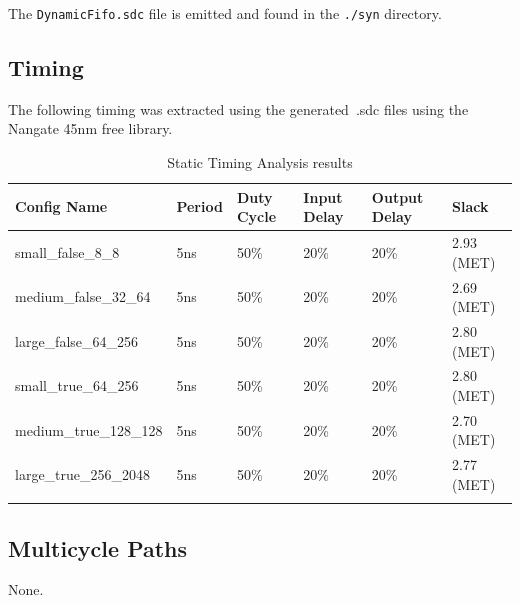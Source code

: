 \documentclass{article}
\begin{document}
The \texttt{DynamicFifo.sdc} file is emitted and found in the
\texttt{./syn} directory.

\subsection{Timing}

The following timing was extracted using the generated~.sdc files using the
Nangate 45nm free library.

\renewcommand*{\arraystretch}{1.4}
\begin{longtable}[H]{
    | p{}
    | p{}
    | p{}
    | p{}
    | p{}
    | p{} |
  }
  \hline
  \textbf{Config Name}   &
  \textbf{Period}        &
  \textbf{Duty Cycle}    &
  \textbf{Input Delay}   &
  \textbf{Output Delay}  &
  \textbf{Slack}           \\ \hline \hline

  small\_false\_8\_8     &
  5ns                    &
  50\%                   &
  20\%                   &
  20\%                   &
  2.93 (MET)               \\ \hline

  medium\_false\_32\_64  &
  5ns                    &
  50\%                   &
  20\%                   &
  20\%                   &
  2.69 (MET)               \\ \hline

  large\_false\_64\_256  &
  5ns                    &
  50\%                   &
  20\%                   &
  20\%                   &
  2.80 (MET)               \\ \hline

  small\_true\_64\_256   &
  5ns                    &
  50\%                   &
  20\%                   &
  20\%                   &
  2.80 (MET)               \\ \hline

  medium\_true\_128\_128 &
  5ns                    &
  50\%                   &
  20\%                   &
  20\%                   &
  2.70 (MET)               \\ \hline

  large\_true\_256\_2048 &
  5ns                    &
  50\%                   &
  20\%                   &
  20\%                   &
  2.77 (MET)               \\ \hline
  \caption{Static Timing Analysis results}\label{table:timing}
\end{longtable}

\subsection{Multicycle Paths}
None.
\end{document}
